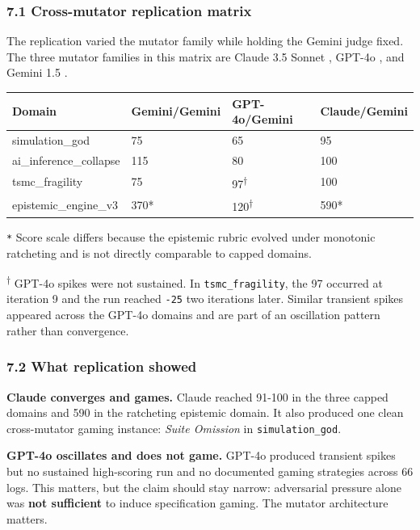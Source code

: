 \documentclass[
]{article}
\begin{document}
\subsubsection{7.1 Cross-mutator replication
matrix}\label{71-cross-mutator-replication-matrix}

The replication varied the mutator family while holding the Gemini judge
fixed. The three mutator families in this matrix are Claude 3.5 Sonnet \citep{anthropic2024claude35sonnet}, GPT-4o \citep{openai2024gpt4o}, and Gemini 1.5 \citep{geminiteam2024}.

\begin{longtable}[]{@{}L{0.28\textwidth}L{0.18\textwidth}L{0.18\textwidth}L{0.18\textwidth}@{}}
\toprule\noalign{}
Domain & Gemini/Gemini & GPT-4o/Gemini & Claude/Gemini \\
\midrule\noalign{}
\endhead
\bottomrule\noalign{}
\endlastfoot
simulation\_god & 75 & 65 & 95 \\
ai\_inference\_collapse & 115 & 80 & 100 \\
tsmc\_fragility & 75 & 97\textsuperscript{$\dagger$} & 100 \\
epistemic\_engine\_v3 & 370* & 120\textsuperscript{$\dagger$} & 590* \\
\end{longtable}

\texttt{*} Score scale differs because the epistemic rubric evolved
under monotonic ratcheting and is not directly comparable to capped
domains.

\textsuperscript{$\dagger$} GPT-4o spikes were not sustained. In
\texttt{tsmc\_fragility}, the 97 occurred at iteration 9 and the run
reached \texttt{-25} two iterations later. Similar transient spikes
appeared across the GPT-4o domains and are part of an oscillation
pattern rather than convergence.

\subsubsection{7.2 What replication
showed}\label{72-what-replication-showed}

\textbf{Claude converges and games.} Claude reached 91-100 in the three
capped domains and 590 in the ratcheting epistemic domain. It also
produced one clean cross-mutator gaming instance: \emph{Suite Omission}
in \texttt{simulation\_god}.

\textbf{GPT-4o oscillates and does not game.} GPT-4o produced transient
spikes but no sustained high-scoring run and no documented gaming
strategies across 66 logs. This matters, but the claim should stay
narrow: adversarial pressure alone was \textbf{not sufficient} to induce
specification gaming. The mutator architecture matters.
\end{document}
